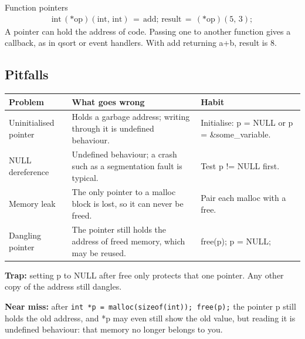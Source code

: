 \documentclass[11pt]{article}
\begin{document}
\begin{keepsection}
\begin{keepsection}
\begin{equationcard}{Function pointers}
\[ \begin{gathered} \text{int}\, (*\text{op})(\text{int},\, \text{int})\, =\, \text{add};\, \text{result}\, =\, (*\text{op})(5,\, 3); \end{gathered} \]
{\small A pointer can hold the address of code. Passing one to another function gives a callback, as in qsort or event handlers. With add returning a+b, result is 8.}
\end{equationcard}
\end{keepsection}

\begin{keepsection}
\subsection{Pitfalls}

\begin{center}\small\begin{tabularx}{\linewidth}{>{\raggedright\arraybackslash}X>{\raggedright\arraybackslash}X>{\raggedright\arraybackslash}X}\toprule
\textbf{Problem} & \textbf{What goes wrong} & \textbf{Habit} \\ \midrule
Uninitialised pointer & Holds a garbage address; writing through it is undefined behaviour. & Initialise: p = NULL or p = \&some\_variable. \\
NULL dereference & Undefined behaviour; a crash such as a segmentation fault is typical. & Test p != NULL first. \\
Memory leak & The only pointer to a malloc block is lost, so it can never be freed. & Pair each malloc with a free. \\
Dangling pointer & The pointer still holds the address of freed memory, which may be reused. & free(p); p = NULL; \\
\bottomrule\end{tabularx}\end{center}

\begin{notebox}\textbf{Trap:} setting p to NULL after free only protects that one pointer. Any other copy of the address still dangles.\end{notebox}

\begin{notebox}\textbf{Near miss:} after \texttt{int *p = malloc(sizeof(int)); free(p);} the pointer p still holds the old address, and *p may even still show the old value, but reading it is undefined behaviour: that memory no longer belongs to you.\end{notebox}


\end{keepsection}
\end{keepsection}
\end{document}
